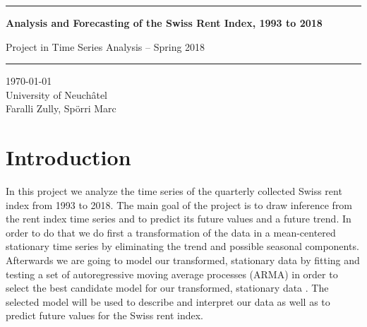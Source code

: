 \documentclass[11pt,a4paper]{article}
\begin{document}

\thispagestyle{empty}  %

\begin{center}

\vspace*{4cm}

\noindent\rule{15cm}{0.4pt}

\vspace*{2cm}

\Huge{\textbf{Analysis and Forecasting of the Swiss Rent Index, 1993 to 2018}}

\vspace{1cm}

\LARGE{Project in Time Series Analysis -- Spring 2018}

\vspace{2cm}

\noindent\rule{15cm}{0.4pt}

\vfill

\large{
    \today\\
    University of Neuchâtel\\
    Faralli Zully, Spörri Marc\\
    
}

\vspace{2cm}

\end{center}


\newpage




\tableofcontents
\newpage



\section{Introduction}

In this project we analyze the time series of the quarterly collected Swiss rent index from 1993 to 2018.
The main goal of the project is to draw inference from the rent index time series and to predict its future values and a future trend.
In order to do that we do first a transformation of the data in a mean-centered stationary time series by eliminating the trend and possible seasonal components.
Afterwards we are going to model our transformed, stationary data by fitting and testing a set of autoregressive moving average processes (ARMA) in order to select the best candidate model for our transformed, stationary data \cite[p.~82--110]{bd02}.
The selected model will be used to describe and interpret our data as well as to predict future values for the Swiss rent index.
\end{document}
